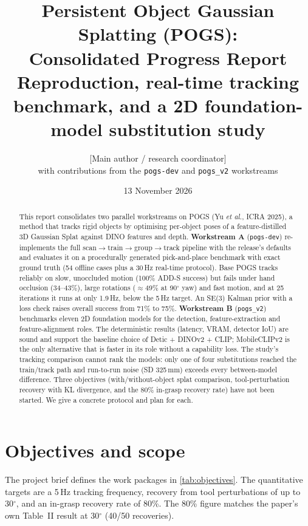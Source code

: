 \documentclass[10pt,a4paper]{article}
\title{\textbf{Persistent Object Gaussian Splatting (POGS):\\
Consolidated Progress Report}\\[4pt]
\large Reproduction, real-time tracking benchmark, and a 2D foundation-model substitution study}
\author{[Main author / research coordinator]\\
\small with contributions from the \texttt{pogs-dev} and \texttt{pogs\_v2} workstreams}
\date{13 November 2026}
\begin{document}
\maketitle

\begin{abstract}
\noindent
This report consolidates two parallel workstreams on POGS (Yu \emph{et al.}, ICRA 2025), a method that
tracks rigid objects by optimising per-object poses of a feature-distilled 3D Gaussian Splat
against DINO features and depth. \textbf{Workstream A} (\texttt{pogs-dev}) re-implements the full
scan$\to$train$\to$group$\to$track pipeline with the release's defaults and evaluates it on a
procedurally generated pick-and-place benchmark with exact ground truth (54 offline cases plus a
30\,Hz real-time protocol). Base POGS tracks reliably on slow, unoccluded motion
(100\% ADD-S success) but fails under hand occlusion (34--43\%), large rotations ($\approx$49\% at
90$^\circ$ yaw) and fast motion, and at 25 iterations it runs at only 1.9\,Hz, below the 5\,Hz target.
An SE(3) Kalman prior with a loss check raises overall success from 71\% to 75\%.
\textbf{Workstream B} (\texttt{pogs\_v2}) benchmarks eleven 2D foundation models for the
detection, feature-extraction and feature-alignment roles. The deterministic results (latency, VRAM,
detector IoU) are sound and support the baseline choice of Detic + DINOv2 + CLIP; MobileCLIPv2 is
the only alternative that is faster in its role without a capability loss. The study's tracking
comparison cannot rank the models: only one of four substitutions reached the train/track path
and run-to-run noise (SD 325\,mm) exceeds every between-model difference.
Three objectives (with/without-object splat comparison, tool-perturbation recovery with KL
divergence, and the 80\% in-grasp recovery rate) have not been started. We give a concrete
protocol and plan for each.
\end{abstract}

\tableofcontents
\newpage

\section{Objectives and scope}
The project brief defines the work packages in \cref{tab:objectives}. The quantitative targets
are a 5\,Hz tracking frequency, recovery from tool perturbations of up to 30$^\circ$, and an
in-grasp recovery rate of 80\%. The 80\% figure matches the paper's own Table~II result at
30$^\circ$ (40/50 recoveries).
\end{document}
